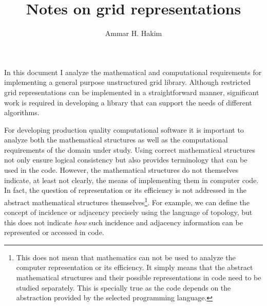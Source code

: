 \documentclass[11pt, reqno]{amsart}
\title[Grid Representation]{Notes on grid representations}%
\author{Ammar H. Hakim}%
\date{}
\theoremstyle{definition}
\begin{document}
\maketitle

In this document I analyze the mathematical and computational
requirements for implementing a general purpose unstructured grid
library. Although restricted grid representations can be implemented
in a straightforward manner, significant work is required in
developing a library that can support the needs of different
algorithms. 


For developing production quality computational software it is
important to analyze both the mathematical structures as well as the
computational requirements of the domain under study. Using correct
mathematical structures not only ensure logical consistency but also
provides terminology that can be used in the code. However, the
mathematical structures do not themselves indicate, at least not
clearly, the means of implementing them in computer code. In fact, the
question of representation or its efficiency is not addressed in the
abstract mathematical structures themselves\footnote{This does not
  mean that mathematics can not be used to analyze the computer
  representation or its efficiency. It simply means that the abstract
  mathematical structures and their possible representations in code
  need to be studied separately. This is specially true as the code
  depends on the abstraction provided by the selected programming
  language.}. For example, we can define the concept of incidence or
adjacency precisely using the language of topology, but this does not
indicate \emph{how} such incidence and adjacency information can be
represented or accessed in code.
\end{document}
